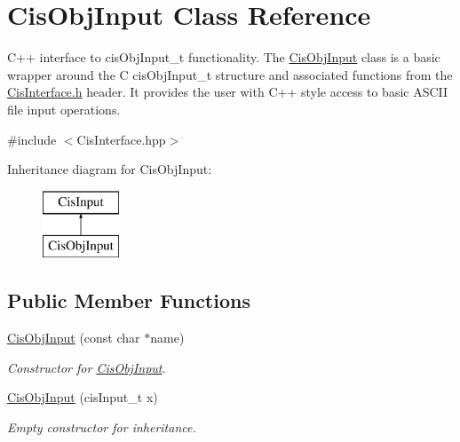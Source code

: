 \hypertarget{classCisObjInput}{}\section{Cis\+Obj\+Input Class Reference}
\label{classCisObjInput}


C++ interface to cis\+Obj\+Input\+\_\+t functionality. The \mbox{\hyperlink{classCisObjInput}{Cis\+Obj\+Input}} class is a basic wrapper around the C cis\+Obj\+Input\+\_\+t structure and associated functions from the \mbox{\hyperlink{CisInterface_8h_source}{Cis\+Interface.\+h}} header. It provides the user with C++ style access to basic A\+S\+C\+II file input operations.  




{\ttfamily \#include $<$Cis\+Interface.\+hpp$>$}

Inheritance diagram for Cis\+Obj\+Input\+:\begin{figure}[H]
\begin{center}
\leavevmode
\includegraphics[height=2.000000cm]{classCisObjInput}
\end{center}
\end{figure}
\subsection*{Public Member Functions}
\begin{DoxyCompactItemize}
\item 
\mbox{\hyperlink{classCisObjInput_a76dfa86d8de7415db586f5993271c5fe}{Cis\+Obj\+Input}} (const char $\ast$name)
\begin{DoxyCompactList}\small\item\em Constructor for \mbox{\hyperlink{classCisObjInput}{Cis\+Obj\+Input}}. \end{DoxyCompactList}\item 
\mbox{\label{classCisObjInput_a159e6c8945d6fa7fd8361a045255eddb}} 
\mbox{\hyperlink{classCisObjInput_a159e6c8945d6fa7fd8361a045255eddb}{Cis\+Obj\+Input}} (cis\+Input\+\_\+t x)
\begin{DoxyCompactList}\small\item\em Empty constructor for inheritance. \end{DoxyCompactList}\end{DoxyCompactItemize}


